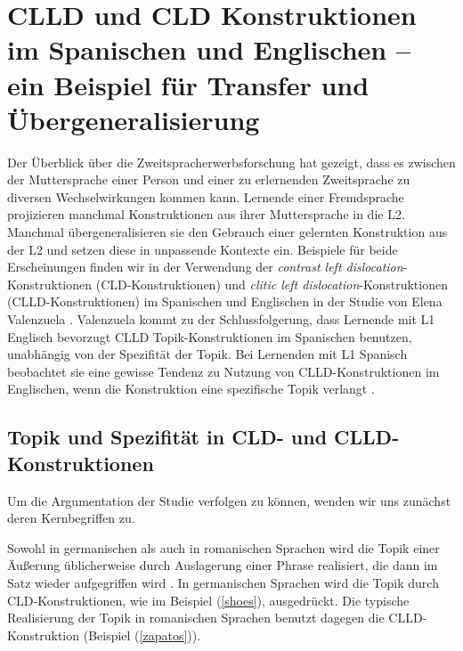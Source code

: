 \section{CLLD und CLD Konstruktionen im Spanischen und Englischen -- ein Beispiel für Transfer und Übergeneralisierung}


Der Überblick über die Zweitspracherwerbsforschung hat gezeigt, dass es zwischen der Muttersprache einer Person und einer zu erlernenden Zweitsprache zu diversen Wechselwirkungen kommen kann.
Lernende einer Fremdsprache projizieren manchmal Konstruktionen aus ihrer Muttersprache in die L2.
Manchmal übergeneralisieren sie den Gebrauch einer gelernten Konstruktion aus der L2 und setzen diese in unpassende Kontexte ein.
Beispiele für beide Erscheinungen finden wir in der Verwendung der \textit{contrast left dislocation}-Konstruktionen (CLD-Konstruktionen) und \textit{clitic left dislocation}-Konstruktionen (CLLD-Konstruktionen) im Spanischen und Englischen in der Studie von Elena Valenzuela \cite{Valenzuela05}.
Valenzuela kommt zu der Schlussfolgerung, dass Lernende mit L1 Englisch bevorzugt CLLD Topik-Konstruktionen im Spanischen benutzen, unabhängig von der Spezifität der Topik.
Bei Lernenden mit L1 Spanisch beobachtet sie eine gewisse Tendenz zu Nutzung von CLLD-Konstruktionen im Englischen, wenn die Konstruktion eine spezifische Topik verlangt \cite{Valenzuela05}.




\subsection{Topik und Spezifität in CLD- und CLLD-Konstruktionen}
Um die Argumentation der Studie \cite{Valenzuela05} verfolgen zu können, wenden wir uns zunächst deren Kernbegriffen zu.

Sowohl in germanischen als auch in romanischen Sprachen wird die Topik einer Äußerung üblicherweise durch Auslagerung einer Phrase realisiert, die dann im Satz wieder aufgegriffen wird \cite{Valenzuela05}.
In germanischen Sprachen wird die Topik durch CLD-Konstruktionen, wie im Beispiel (\ref{shoes}), ausgedrückt.
Die typische Realisierung der Topik in romanischen Sprachen benutzt dagegen die CLLD-Konstruktion (Beispiel (\ref{zapatos})).

